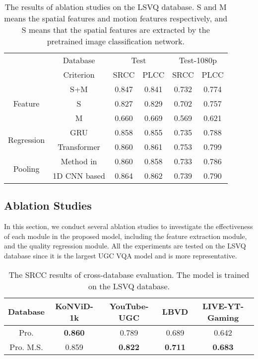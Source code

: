 \documentclass[sigconf]{acmart}
\begin{document}
\begin{table}
\centering
\renewcommand{\arraystretch}{1}
\caption{The results of ablation studies on the LSVQ database. S and M means the spatial features and motion features respectively, and S means that the spatial features are extracted by the pretrained image classification network.}
\label{ablation_study}
\begin{tabular}{c|c|cc|cc}
\toprule[.15em]
\multirow{2}{*}{} & Database & \multicolumn{2}{c|}{Test} & \multicolumn{2}{c}{Test-1080p}  \\
 & Criterion & SRCC & PLCC & SRCC & PLCC  \\
\hline
\multirow{3}{*}{Feature}
&S+M& 0.847 & 0.841 & 0.732 &  0.774 \\
&S& 0.827 & 0.829 & 0.702 & 0.757  \\
&M& 0.660 & 0.669 & 0.569 & 0.621  \\
\hline
\multirow{2}{*}{Regression}
&GRU& 0.858 & 0.855 & 0.735 & 0.788  \\
&Transformer& 0.860 & 0.861 & 0.753 &0.799   \\
\hline
\multirow{2}{*}{Pooling}
& Method in \cite{li2019quality}& 0.860 & 0.858 & 0.733 & 0.786  \\
&1D CNN based& 0.864 & 0.862 & 0.739 &  0.790 \\
\bottomrule[.15em]
\end{tabular}
\end{table}


\subsection{Ablation Studies}
In this section, we conduct several ablation studies to investigate the effectiveness of each module in the proposed model, including the feature extraction module, and the quality regression module. All the experiments are tested on the LSVQ database since it is the largest UGC VQA model and is more representative.


\begin{table}
\small
\centering
\renewcommand{\arraystretch}{1}
\caption{The SRCC results of cross-database evaluation. The model is trained on the LSVQ database. }
\label{cross_database_evaluation}
\begin{tabular}{c|cccc}
\toprule[.15em]
 Database & KoNViD-1k & YouTube-UGC & LBVD & LIVE-YT-Gaming  \\
\hline
Pro.&  \textbf{0.860}&  0.789 &  0.689& 0.642  \\
Pro. M.S.&  0.859&  \textbf{0.822}&  \textbf{0.711}&  \textbf{0.683} \\
\bottomrule[.15em]
\end{tabular}
\end{table}
\end{document}
